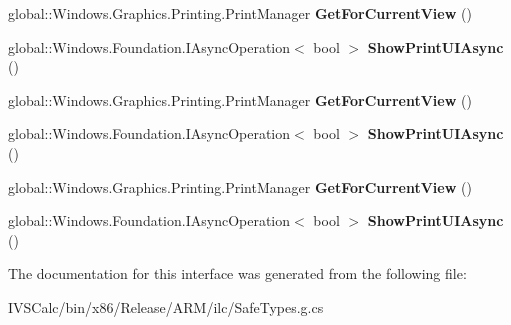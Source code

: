\begin{DoxyCompactItemize}
global\+::\+Windows.\+Graphics.\+Printing.\+Print\+Manager {\bfseries Get\+For\+Current\+View} ()
\item 
\mbox{\label{interface_windows_1_1_graphics_1_1_printing_1_1_i_print_manager_static_ac19fbbfc587c81192c5d214e451f07be}} 
global\+::\+Windows.\+Foundation.\+I\+Async\+Operation$<$ bool $>$ {\bfseries Show\+Print\+U\+I\+Async} ()
\item 
\mbox{\label{interface_windows_1_1_graphics_1_1_printing_1_1_i_print_manager_static_a49be49c2a159d64c554f46a2999627b0}} 
global\+::\+Windows.\+Graphics.\+Printing.\+Print\+Manager {\bfseries Get\+For\+Current\+View} ()
\item 
\mbox{\label{interface_windows_1_1_graphics_1_1_printing_1_1_i_print_manager_static_ac19fbbfc587c81192c5d214e451f07be}} 
global\+::\+Windows.\+Foundation.\+I\+Async\+Operation$<$ bool $>$ {\bfseries Show\+Print\+U\+I\+Async} ()
\item 
\mbox{\label{interface_windows_1_1_graphics_1_1_printing_1_1_i_print_manager_static_a49be49c2a159d64c554f46a2999627b0}} 
global\+::\+Windows.\+Graphics.\+Printing.\+Print\+Manager {\bfseries Get\+For\+Current\+View} ()
\item 
\mbox{\label{interface_windows_1_1_graphics_1_1_printing_1_1_i_print_manager_static_ac19fbbfc587c81192c5d214e451f07be}} 
global\+::\+Windows.\+Foundation.\+I\+Async\+Operation$<$ bool $>$ {\bfseries Show\+Print\+U\+I\+Async} ()
\end{DoxyCompactItemize}


The documentation for this interface was generated from the following file\+:\begin{DoxyCompactItemize}
\item 
I\+V\+S\+Calc/bin/x86/\+Release/\+A\+R\+M/ilc/Safe\+Types.\+g.\+cs\end{DoxyCompactItemize}
